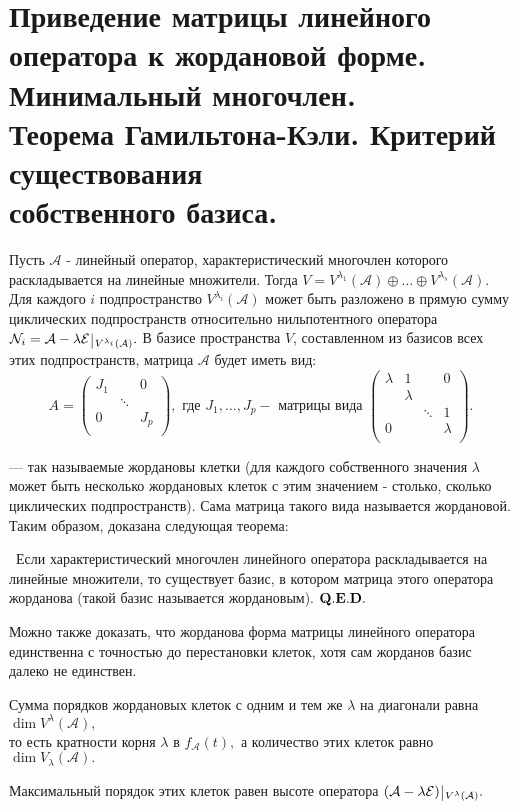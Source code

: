 \documentclass[a4paper]{article}%
\renewcommand{\ab}{\par\noindent}%
\newcommand{\te}{\par\noindent{\bf Теорема.}\ }%
\newcommand{\qed}{\quad${{\bf Q.E.D.}}$}
\newcommand{\ps}{\oplus}
\newcommand{\op}[1]{$\mathcal{#1}$}
\renewcommand{\om}[1]{\mathcal{#1}}
\begin{document}
\section{Приведение матрицы линейного оператора к жордановой форме. Минимальный многочлен.\\ Теорема Гамильтона-Кэли. Критерий существования\\ собственного базиса.}
\label{q35} %
\ab Пусть \op{A} - линейный оператор, характеристический многочлен которого раскладывается на линейные
множители. Тогда $V=V^{\lambda_1}(\om{A})\ps\dots\ps V^{\lambda_s}(\om{A}).$ Для каждого $i$ подпространство
$V^{\lambda_i}(\om{A})$ может быть разложено в прямую сумму циклических подпространств относительно
нильпотентного оператора $\om{N}_i=\om{A-\lambda E}\,\vrule\,_{V^{\lambda_i}(\om{A})}.$ В базисе
пространства $V$, составленном из базисов всех этих подпространств, матрица \op{A} будет иметь вид:
$$
A=\left(%
\begin{array}{ccc}
  J_1 &  & 0 \\
   & \ddots &  \\
  0 &  & J_p \\
\end{array}%
\right),\mbox{\ где\ }J_1,\dots,J_p - \mbox{\ матрицы вида\ } \left(%
\begin{array}{cccc}
  \lambda & 1 &  & 0 \\
   & \lambda &  &  \\
   &  & \ddots & 1 \\
  0 &  &  & \lambda \\
\end{array}%
\right).
$$
\ab --- так называемые жордановы клетки (для каждого собственного значения $\lambda$ может быть несколько
жордановых клеток с этим значением - столько, сколько циклических подпространств). Сама матрица такого вида
называется жордановой. Таким образом, доказана следующая теорема: %
\te Если характеристический многочлен линейного оператора раскладывается на линейные множители, то существует
базис, в котором матрица этого оператора жорданова (такой базис называется жордановым). \qed%
\ab Можно также доказать, что жорданова форма матрицы линейного оператора единственна с точностью до
перестановки клеток, хотя сам жорданов базис далеко не единствен. %
\ab Сумма порядков жордановых клеток с одним и тем же $\lambda$ на диагонали равна $\dim V^\lambda(\om{A}),$\\ то
есть кратности корня $\lambda$ в $f_\om{A}(t),$ а количество этих клеток равно $\dim V_\lambda(\om{A}).$ %
\ab Максимальный порядок этих клеток равен высоте оператора $(\om{A-\lambda E})\,\vrule\,_{V^\lambda(\om{A})}.$
\end{document}
